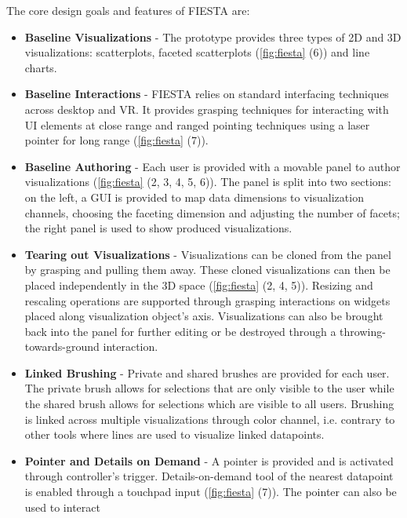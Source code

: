 \documentclass{vgtc}                          %
\begin{document}
\medskip

\noindent The core design goals and features of FIESTA are:
\begin{itemize}
	\item \textbf{Baseline Visualizations} - The prototype provides three types
	      of 2D and 3D visualizations: scatterplots, faceted scatterplots
	      (\cref{fig:fiesta} (6)) and line charts.
	\item \textbf{Baseline Interactions} - FIESTA relies on standard
	      interfacing techniques across desktop and VR. It provides grasping
	      techniques for interacting with UI elements at close range and ranged
	      pointing techniques using a laser pointer for long range
	      (\cref{fig:fiesta} (7)).
	\item \textbf{Baseline Authoring} - Each user is provided with a movable
	      panel to author visualizations (\cref{fig:fiesta} (2, 3, 4, 5, 6)).
	      The panel is split into two sections: on the left, a GUI is provided
	      to map data dimensions to visualization channels, choosing the
	      faceting dimension and adjusting the number of facets; the right
	      panel is used to show produced visualizations.
	\item \textbf{Tearing out Visualizations} - Visualizations can be cloned
	      from the panel by grasping and pulling them away. These cloned
	      visualizations can then be placed independently in the 3D space
	      (\cref{fig:fiesta} (2, 4, 5)). Resizing and rescaling operations are
	      supported through grasping interactions on widgets placed along
	      visualization object's axis. Visualizations can also be brought back
	      into the panel for further editing or be destroyed through a
	      throwing-towards-ground interaction.
	\item \textbf{Linked Brushing} - Private and shared brushes are provided
	      for each user. The private brush allows for selections that are only
	      visible to the user while the shared brush allows for selections
	      which are visible to all users. Brushing is linked across multiple
	      visualizations through color channel, i.e. contrary to other tools
	      where lines are used to visualize linked datapoints.
	\item \textbf{Pointer and Details on Demand} - A pointer is provided and is
	      activated through controller's trigger. Details-on-demand tool of the
	      nearest datapoint is enabled through a touchpad input
	      (\cref{fig:fiesta} (7)). The pointer can also be used to interact

\end{itemize}
\end{document}
